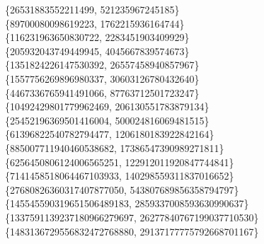 \documentclass[fleqn]{article}
\begin{document}
    \{26531883552211499, 521235967245185\} \\
    \{89700080098619223, 1762215936164744\} \\
    \{116231963650830722, 2283451903409929\} \\
    \{205932043749449945, 4045667839574673\} \\
    \{1351824226147530392, 26557458940857967\} \\
    \{1557756269896980337, 30603126780432640\} \\
    \{4467336765941491066, 87763712501723247\} \\
    \{10492429801779962469, 206130551783879134\} \\
    \{25452196369501416004, 500024816069481515\} \\
    \{61396822540782794477, 1206180183922842164\} \\
    \{885007711940460538682, 17386547390989271811\} \\ 
    \{6256450806124006565251, 122912011920847744841\} \\
    \{7141458518064467103933, 140298559311837016652\} \\
    \{27680826360317407877050, 543807689856358794797\} \\
    \{145545590319651506489183, 2859337008593630990637\} \\
    \{1337591139237180966279697, 26277840767199037710530\} \\
    \{1483136729556832472768880, 29137177775792668701167\} \\
\end{document}
